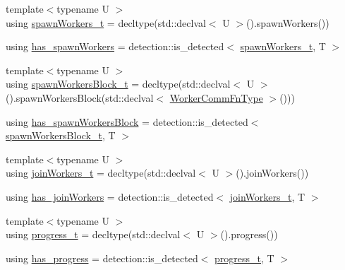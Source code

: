 \begin{DoxyCompactItemize}
\item 
{\footnotesize template$<$typename U $>$ }\\using \hyperlink{structvt_1_1worker_1_1_worker_group_traits_a9a4aa1adc4280b6689a7c0212eca4577}{spawn\+Workers\+\_\+t} = decltype(std\+::declval$<$ U $>$().spawn\+Workers())
\item 
using \hyperlink{structvt_1_1worker_1_1_worker_group_traits_a991fbf48784303601281452f8d3c53c8}{has\+\_\+spawn\+Workers} = detection\+::is\+\_\+detected$<$ \hyperlink{structvt_1_1worker_1_1_worker_group_traits_a9a4aa1adc4280b6689a7c0212eca4577}{spawn\+Workers\+\_\+t}, T $>$
\item 
{\footnotesize template$<$typename U $>$ }\\using \hyperlink{structvt_1_1worker_1_1_worker_group_traits_a23a7958cfe2a25001735c4d8eff808e8}{spawn\+Workers\+Block\+\_\+t} = decltype(std\+::declval$<$ U $>$().spawn\+Workers\+Block(std\+::declval$<$ \hyperlink{namespacevt_1_1worker_af5cc6dd44a4444b2e5498ca279a9f04d}{Worker\+Comm\+Fn\+Type} $>$()))
\item 
using \hyperlink{structvt_1_1worker_1_1_worker_group_traits_afbef955b75a4d9397000bb9258050c3b}{has\+\_\+spawn\+Workers\+Block} = detection\+::is\+\_\+detected$<$ \hyperlink{structvt_1_1worker_1_1_worker_group_traits_a23a7958cfe2a25001735c4d8eff808e8}{spawn\+Workers\+Block\+\_\+t}, T $>$
\item 
{\footnotesize template$<$typename U $>$ }\\using \hyperlink{structvt_1_1worker_1_1_worker_group_traits_a002c86e937f3022ee8320ec1d9eb488b}{join\+Workers\+\_\+t} = decltype(std\+::declval$<$ U $>$().join\+Workers())
\item 
using \hyperlink{structvt_1_1worker_1_1_worker_group_traits_a1341eeadf82a951575948a73e0dfbe71}{has\+\_\+join\+Workers} = detection\+::is\+\_\+detected$<$ \hyperlink{structvt_1_1worker_1_1_worker_group_traits_a002c86e937f3022ee8320ec1d9eb488b}{join\+Workers\+\_\+t}, T $>$
\item 
{\footnotesize template$<$typename U $>$ }\\using \hyperlink{structvt_1_1worker_1_1_worker_group_traits_ae36a285568af422079494454bd4bdeae}{progress\+\_\+t} = decltype(std\+::declval$<$ U $>$().progress())
\item 
using \hyperlink{structvt_1_1worker_1_1_worker_group_traits_a53b49db498da05de17fea98afe4e6677}{has\+\_\+progress} = detection\+::is\+\_\+detected$<$ \hyperlink{structvt_1_1worker_1_1_worker_group_traits_ae36a285568af422079494454bd4bdeae}{progress\+\_\+t}, T $>$

\end{DoxyCompactItemize}
